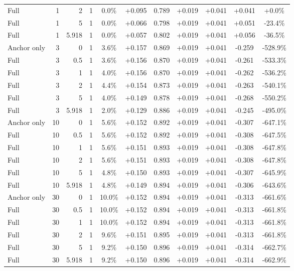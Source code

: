 \begin{table}[htbp]
\begin{tabular}{lrrrccccccc}
Full & 1 & 2 & 1 & 0.0\% & +0.095 & 0.789 & +0.019 & +0.041 & +0.041 & +0.0\% \\
Full & 1 & 5 & 1 & 0.0\% & +0.066 & 0.798 & +0.019 & +0.041 & +0.051 & -23.4\% \\
Full & 1 & 5.918 & 1 & 0.0\% & +0.057 & 0.802 & +0.019 & +0.041 & +0.056 & -36.5\% \\
Anchor only & 3 & 0 & 1 & 3.6\% & +0.157 & 0.869 & +0.019 & +0.041 & -0.259 & -528.9\% \\
Full & 3 & 0.5 & 1 & 3.6\% & +0.156 & 0.870 & +0.019 & +0.041 & -0.261 & -533.3\% \\
Full & 3 & 1 & 1 & 4.0\% & +0.156 & 0.870 & +0.019 & +0.041 & -0.262 & -536.2\% \\
Full & 3 & 2 & 1 & 4.4\% & +0.154 & 0.873 & +0.019 & +0.041 & -0.263 & -540.1\% \\
Full & 3 & 5 & 1 & 4.0\% & +0.149 & 0.878 & +0.019 & +0.041 & -0.268 & -550.2\% \\
Full & 3 & 5.918 & 1 & 2.0\% & +0.129 & 0.886 & +0.019 & +0.041 & -0.245 & -495.0\% \\
Anchor only & 10 & 0 & 1 & 5.6\% & +0.152 & 0.892 & +0.019 & +0.041 & -0.307 & -647.1\% \\
Full & 10 & 0.5 & 1 & 5.6\% & +0.152 & 0.892 & +0.019 & +0.041 & -0.308 & -647.5\% \\
Full & 10 & 1 & 1 & 5.6\% & +0.151 & 0.893 & +0.019 & +0.041 & -0.308 & -647.8\% \\
Full & 10 & 2 & 1 & 5.6\% & +0.151 & 0.893 & +0.019 & +0.041 & -0.308 & -647.8\% \\
Full & 10 & 5 & 1 & 4.8\% & +0.150 & 0.893 & +0.019 & +0.041 & -0.307 & -645.9\% \\
Full & 10 & 5.918 & 1 & 4.8\% & +0.149 & 0.894 & +0.019 & +0.041 & -0.306 & -643.6\% \\
Anchor only & 30 & 0 & 1 & 10.0\% & +0.152 & 0.894 & +0.019 & +0.041 & -0.313 & -661.6\% \\
Full & 30 & 0.5 & 1 & 10.0\% & +0.152 & 0.894 & +0.019 & +0.041 & -0.313 & -661.8\% \\
Full & 30 & 1 & 1 & 10.0\% & +0.152 & 0.894 & +0.019 & +0.041 & -0.313 & -661.8\% \\
Full & 30 & 2 & 1 & 9.6\% & +0.151 & 0.895 & +0.019 & +0.041 & -0.313 & -661.8\% \\
Full & 30 & 5 & 1 & 9.2\% & +0.150 & 0.896 & +0.019 & +0.041 & -0.314 & -662.7\% \\
Full & 30 & 5.918 & 1 & 9.2\% & +0.150 & 0.896 & +0.019 & +0.041 & -0.314 & -662.9\% \\

\end{tabular}
\end{table}
